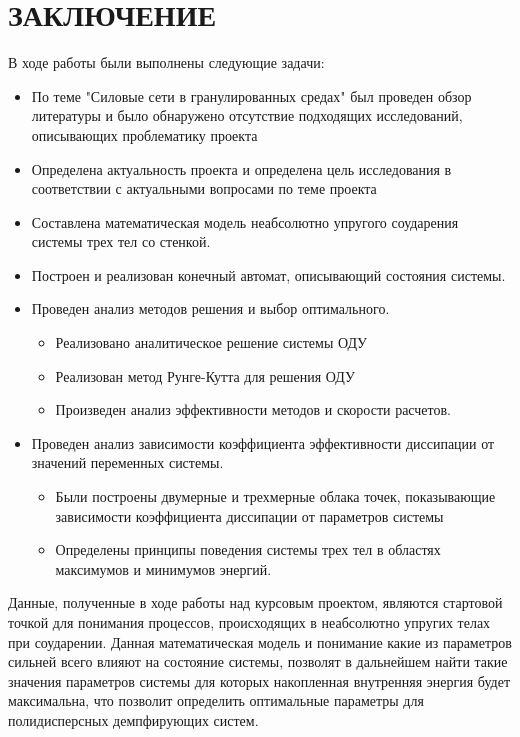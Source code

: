 
\chapter{ЗАКЛЮЧЕНИЕ}

В ходе работы были выполнены следующие задачи:
\begin{itemize}
	\item По теме "Силовые сети в гранулированных средах" был проведен обзор литературы и было обнаружено отсутствие подходящих исследований, описывающих проблематику проекта
	\item Определена актуальность проекта и определена цель исследования в соответствии с актуальными вопросами по теме проекта
	\item Составлена математическая модель неабсолютно упругого соударения системы трех тел со стенкой.
	\item Построен и реализован конечный автомат, описывающий состояния системы.
	\item Проведен анализ методов решения и выбор оптимального. 
	\begin{itemize}
		\item Реализовано аналитическое решение системы ОДУ
		\item Реализован метод Рунге-Кутта для решения ОДУ
		\item Произведен анализ эффективности методов и скорости расчетов.
	\end{itemize}
	\item Проведен анализ зависимости коэффициента эффективности диссипации от значений переменных системы.
	\begin{itemize}
		\item Были построены двумерные и трехмерные облака точек, показывающие зависимости коэффициента диссипации от параметров системы
		\item Определены принципы поведения системы трех тел в областях максимумов и минимумов энергий.  
	\end{itemize}
\end{itemize}

Данные, полученные в ходе работы над курсовым проектом, являются стартовой точкой для понимания процессов, происходящих в неабсолютно упругих телах при соударении. Данная математическая модель и понимание какие из параметров сильней всего влияют на состояние системы, позволят в дальнейшем найти такие значения параметров системы для которых накопленная внутренняя энергия будет максимальна, что позволит определить оптимальные параметры для полидисперсных демпфирующих систем. 
